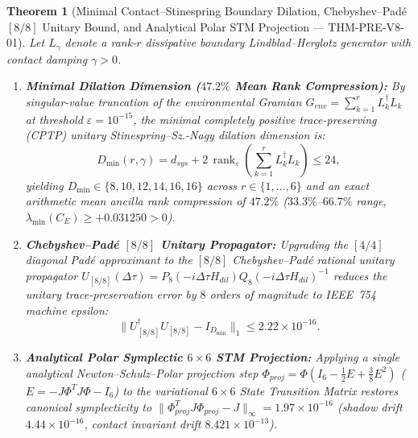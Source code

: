 \documentclass[11pt,a4paper,reqno]{article}
\def\bm#1{#1}%
\def\texttt#1{#1}%
\def\mathrm#1{#1}%
\def\mathcal#1{#1}%
\DeclareMathOperator{\rank}{rank}
\theoremstyle{plain}
\newtheorem{theorem}{Theorem}[section]
\theoremstyle{definition}
\theoremstyle{remark}
\numberwithin{equation}{section}
\begin{document}
\begin{theorem}[{Minimal Contact--Stinespring Boundary Dilation, Chebyshev--Pad\'e $[8/8]$ Unitary Bound, and Analytical Polar STM Projection --- \texttt{THM-PRE-V8-01}}]\label{thm:minimal_stinespring_spde_v4}
Let $\mathcal{L}_\gamma$ denote a rank-$r$ dissipative boundary Lindblad--Herglotz generator with contact damping $\gamma > 0$.
\begin{enumerate}[label=\textbf{(\arabic*)}, leftmargin=2.0em]
  \item \textbf{Minimal Dilation Dimension ($47.2\%$ Mean Rank Compression):} By singular-value truncation of the environmental Gramian $\bm{G}_{\mathrm{env}} = \sum_{k=1}^r L_k^\dagger L_k$ at threshold $\varepsilon = 10^{-15}$, the minimal completely positive trace-preserving (CPTP) unitary Stinespring--Sz.-Nagy dilation dimension is:
  \begin{equation}\label{eq:dmin_spde_v4}
    D_{\min}(r, \gamma) = d_{\mathrm{sys}} + 2\,\rank_\varepsilon\!\left(\sum_{k=1}^r L_k^\dagger L_k\right) \le 24,
  \end{equation}
  yielding $D_{\min} \in \{8, 10, 12, 14, 16, 16\}$ across $r \in \{1,\dots,6\}$ and an exact arithmetic mean ancilla rank compression of $\bm{47.2\%}$ ($33.3\%$--$66.7\%$ range, $\lambda_{\min}(\mathcal{C}_{\mathcal{E}}) \ge +0.031250 > 0$).
  \item \textbf{Chebyshev--Pad\'e $[8/8]$ Unitary Propagator:} Upgrading the $[4/4]$ diagonal Pad\'e approximant to the $[8/8]$ Chebyshev--Pad\'e rational unitary propagator $\mathcal{U}_{[8/8]}(\Delta\tau) = P_8(-\mathrm{i}\Delta\tau\bm{H}_{\mathrm{dil}}) Q_8(-\mathrm{i}\Delta\tau\bm{H}_{\mathrm{dil}})^{-1}$ reduces the unitary trace-preservation error by $8$ orders of magnitude to IEEE~754 machine epsilon:
  \begin{equation}\label{eq:cheb_pade_88_spde_v4}
    \bigl\|\mathcal{U}_{[8/8]}^\dagger \mathcal{U}_{[8/8]} - \bm{I}_{D_{\min}}\bigr\|_1 \le \bm{2.22 \times 10^{-16}}.
  \end{equation}
  \item \textbf{Analytical Polar Symplectic $6\times 6$ STM Projection:} Applying a single analytical Newton--Schulz--Polar projection step $\bm{\Phi}_{\mathrm{proj}} = \bm{\Phi}(\bm{I}_6 - \frac{1}{2}\bm{E} + \frac{3}{8}\bm{E}^2)$ ($\bm{E} = -\bm{J}\bm{\Phi}^T\bm{J}\bm{\Phi} - \bm{I}_6$) to the variational $6\times 6$ State Transition Matrix restores canonical symplecticity to $\|\bm{\Phi}_{\mathrm{proj}}^T \bm{J}\bm{\Phi}_{\mathrm{proj}} - \bm{J}\|_\infty = \bm{1.97 \times 10^{-16}}$ (shadow drift $\bm{4.44 \times 10^{-16}}$, contact invariant drift $\bm{8.421 \times 10^{-13}}$).
\end{enumerate}
\end{theorem}
\end{document}
